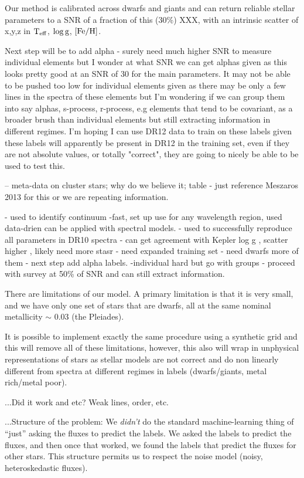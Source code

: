 \documentclass[12pt, preprint]{aastex}
\newcommand{\teff}{\mbox{$\rm T_{eff}$}}
\newcommand{\feh}{\mbox{$\rm [Fe/H]$}}
\newcommand{\logg}{\mbox{$\rm \log g$}}
\begin{document}
Our method is calibrated across dwarfs and giants and can return reliable stellar parameters to a SNR of a fraction of this (30\%) XXX, with an intrinsic scatter of x,y,z in \teff, \logg, \feh.

Next step will be to add alpha - surely need much higher SNR to measure individual elements but 
I wonder at what SNR we can get alphas given as this looks pretty good at an SNR of 30 for the main parameters. It may not be able to be pushed too low for individual elements given as there may be only a few lines in the spectra of these elements but I'm wondering if we can group them into say alphas, s-process, r-process, e.g elements that tend to be covariant, as a broader brush than individual elements but still extracting information in different regimes. I'm hoping I can use DR12 data to train on these labels given these labels will apparently be present in DR12 in the training set, even if they are not absolute values, or totally "correct", they are going to nicely be able to be used to test this. 



-- meta-data on cluster stars; why do we believe it; table - just reference Meszaros 2013 for this or we are repeating information. 

- used to identify continuum
-fast, set up use for any wavelength region, used data-drien can be applied with spectral models. 
- used to successfully reproduce all parameters in DR10 spectra
- can get agreement with Kepler log g , scatter higher , likely need more stasr
- need expanded training set - need dwarfs more of them
- next step add alpha labels. 
-individual hard but go with groups
- proceed with survey at 50\% of SNR and can still extract information.

There are limitations of our model. A primary limitation is that it is very small, and we have only one set of stars that are dwarfs, all at the same nominal metallicity $\sim$ 0.03 (the Pleiades). 

It is possible to implement exactly the same procedure using a synthetic grid and this will remove all of these limitations, however, this also will wrap in unphysical representations of stars as stellar models are not correct and do non linearly different from spectra at different regimes in labels (dwarfs/giants, metal rich/metal poor). 

...Did it work and etc?  Weak lines, order, etc.

...Structure of the problem:
We \emph{didn't} do the standard machine-learning thing of ``just'' asking the fluxes to predict the labels.
We asked the labels to predict the fluxes, and then once that worked, we found the labels that predict the fluxes for other stars.
This structure permits us to respect the noise model (noisy, heteroskedastic fluxes).
\end{document}
